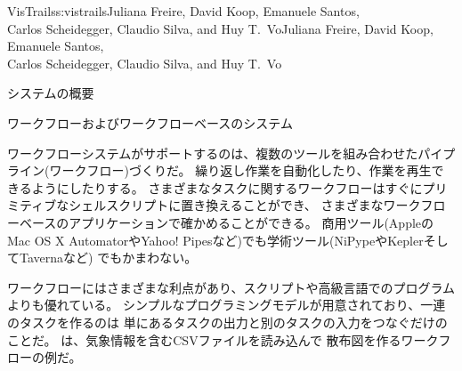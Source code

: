 \begin{aosachaptertoc}{VisTrails}{s:vistrails}{Juliana Freire, David Koop, Emanuele Santos, \\ Carlos Scheidegger, Claudio Silva, and Huy T.\ Vo}{Juliana Freire, David Koop, Emanuele Santos, \\ \hspace*{0.9cm} Carlos Scheidegger, Claudio Silva, and Huy T.\ Vo}
\begin{aosasect1}{システムの概要}
\begin{aosasect2}{ワークフローおよびワークフローベースのシステム}

ワークフローシステムがサポートするのは、複数のツールを組み合わせたパイプライン(ワークフロー)づくりだ。
繰り返し作業を自動化したり、作業を再生できるようにしたりする。
さまざまなタスクに関するワークフローはすぐにプリミティブなシェルスクリプトに置き換えることができ、
さまざまなワークフローベースのアプリケーションで確かめることができる。
商用ツール(AppleのMac OS X AutomatorやYahoo! Pipesなど)でも学術ツール(NiPypeやKeplerそしてTavernaなど)
でもかまわない。

ワークフローにはさまざまな利点があり、スクリプトや高級言語でのプログラムよりも優れている。
シンプルなプログラミングモデルが用意されており、一連のタスクを作るのは
単にあるタスクの出力と別のタスクの入力をつなぐだけのことだ。
は、気象情報を含むCSVファイルを読み込んで
散布図を作るワークフローの例だ。


\end{aosasect2}
\end{aosasect1}
\end{aosachaptertoc}
